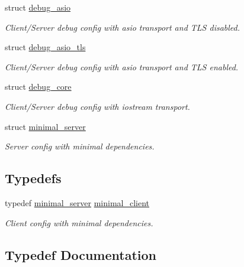 \begin{DoxyCompactItemize}
struct \hyperlink{structwebsocketpp_1_1config_1_1debug__asio}{debug\+\_\+asio}
\begin{DoxyCompactList}\small\item\em Client/\+Server debug config with asio transport and T\+L\+S disabled. \end{DoxyCompactList}\item 
struct \hyperlink{structwebsocketpp_1_1config_1_1debug__asio__tls}{debug\+\_\+asio\+\_\+tls}
\begin{DoxyCompactList}\small\item\em Client/\+Server debug config with asio transport and T\+L\+S enabled. \end{DoxyCompactList}\item 
struct \hyperlink{structwebsocketpp_1_1config_1_1debug__core}{debug\+\_\+core}
\begin{DoxyCompactList}\small\item\em Client/\+Server debug config with iostream transport. \end{DoxyCompactList}\item 
struct \hyperlink{structwebsocketpp_1_1config_1_1minimal__server}{minimal\+\_\+server}
\begin{DoxyCompactList}\small\item\em Server config with minimal dependencies. \end{DoxyCompactList}\end{DoxyCompactItemize}
\subsection*{Typedefs}
\begin{DoxyCompactItemize}
\item 
typedef \hyperlink{structwebsocketpp_1_1config_1_1minimal__server}{minimal\+\_\+server} \hyperlink{namespacewebsocketpp_1_1config_aa83519c150b67a2f3e05c32b88da0322}{minimal\+\_\+client}
\begin{DoxyCompactList}\small\item\em Client config with minimal dependencies. \end{DoxyCompactList}\end{DoxyCompactItemize}


\subsection{Typedef Documentation}
\hypertarget{namespacewebsocketpp_1_1config_aa83519c150b67a2f3e05c32b88da0322}{}

